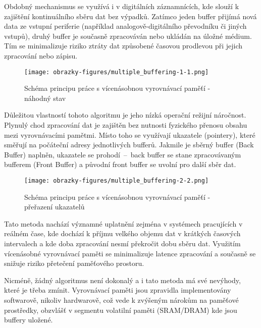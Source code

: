 Obdobný mechanismus se využívá i v digitálních záznamnících, kde slouží k zajištění kontinuálního sběru dat bez výpadků. Zatímco 
jeden buffer přijímá nová data ze vstupní periferie (například analogově-digitálního převodníku či jiných vstupů), druhý buffer 
je současně zpracováván nebo ukládán na úložné médium. Tím se minimalizuje riziko ztráty dat způsobené časovou prodlevou při 
jejich zpracování nebo zápisu.

\begin{figure}[h]
    \centering
    \texttt{[image: obrazky-figures/multiple\_buffering-1-1.png]}
    
    \caption{Schéma principu práce s vícenásobnou vyrovnávací paměťí - náhodný stav}
    \label{fig:multiple-buffering-1}
\end{figure}

Důležitou vlastností tohoto algoritmu je jeho nízká operační režijní náročnost. Plynulý chod zpracování dat je zajištěn bez 
nutnosti fyzického přenosu obsahu mezi vyrovnávacími pamětmi. Místo toho se využívají ukazatele (pointery), které směřují na 
počáteční adresy jednotlivých bufferů. Jakmile je sběrný buffer (Back Buffer) naplněn, ukazatele se prohodí~–~back buffer se 
stane zpracovávaným bufferem (Front Buffer) a původní front buffer se uvolní pro další sběr dat.

\begin{figure}[h]
    \centering
    \texttt{[image: obrazky-figures/multiple\_buffering-2-2.png]}
    
    \caption{Schéma principu práce s vícenásobnou vyrovnávací paměťí - přeřazení ukazatelů}
    \label{fig:multiple-buffering-2}
\end{figure}

Tato metoda nachází významné uplatnění zejména v systémech pracujících v reálném čase, kde dochází k příjmu velkého objemu dat 
v krátkých časových intervalech a kde doba zpracování nesmí překročit dobu sběru dat. Využitím vícenásobné vyrovnávací paměti se 
minimalizuje latence zpracování a současně se snižuje riziko přetečení paměťového prostoru. \cite{buffering_chang}

Nicméně, žádný algoritmus není dokonalý a i tato metoda má své nevýhody, které je třeba zmínit. Vyrovnávací paměti jsou zpravidla 
implementovány softwarově, nikoliv hardwarově, což vede k zvýšeným nárokům na paměťové prostředky, obzvlášť v segmentu volatilní 
paměti (SRAM/DRAM) kde jsou buffery uložené. \cite{basics_of_digital_forensics}

